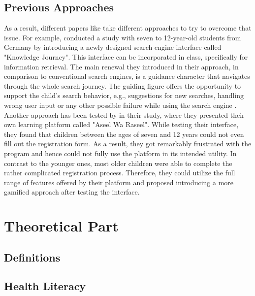 \subsection{Previous Approaches}
\label{subsection:PreviousApproaches}
As a result, different papers like \textcite[]{gossen2012search, alhussayen2015evaluating, lozano2016dedigitalizing} take different approaches to try to overcome that issue. 
For example, \textcite[]{gossen2012search} conducted a study with seven to 12-year-old students from Germany by introducing a newly designed search engine interface called "Knowledge Journey". This interface can be incorporated in class, specifically for information retrieval. The main renewal they introduced in their approach, in comparison to conventional search engines, is a guidance character that navigates through the whole search journey. The guiding figure offers the opportunity to support the child's search behavior, e.g., suggestions for new searches, handling wrong user input or any other possible failure while using the search engine \autocite[]{gossen2012search}.
Another approach has been tested by \textcite[]{alhussayen2015evaluating} in their study, where they presented their own learning platform called "Aseel Wa Raseel". While testing their interface, they found that children between the ages of seven and 12 years could not even fill out the registration form. As a result, they got remarkably frustrated with the program and hence could not fully use the platform in its intended utility. 
In contrast to the younger ones, most older children were able to complete the rather complicated registration process. Therefore, they could utilize the full range of features offered by their platform and proposed introducing a more gamified approach after testing the interface.




\section{Theoretical Part}
\label{section:TheoreticalPart}

\subsection{Definitions}
\label{subsection:Definitions}


\subsection{Health Literacy}
\label{subsection:HealthLiteracy}

